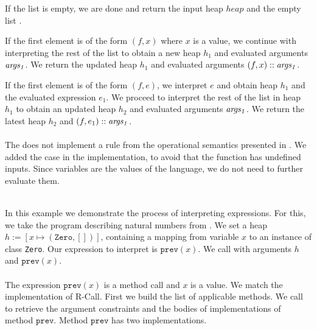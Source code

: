If the list is empty, we are done and return the input heap $heap$
and the empty list \nil.

If the first element is of the form $(f, x)$ where $x$ is a value,
we continue with interpreting the rest of the list
to obtain a new heap $h_1$ and evaluated arguments $\mathit{args_1}$.
We return the updated heap $h_1$ and evaluated arguments $(f, x) :: \mathit{args_1}$.

If the first element is of the form $(f, e)$,
we interpret $e$ and obtain heap $h_1$ and the evaluated expression $e_1$.
We proceed to interpret the rest of the list in heap $h_1$
to obtain an updated heap $h_2$ and evaluated arguments $\mathit{args_1}$.
We return the latest heap $h_2$ and $(f, e_1) :: \mathit{args_1}$.\\
\\
The  does not implement
a rule from the operational semantics presented in .
We added the case in the implementation,
to avoid that the function has undefined inputs.
Since variables are the values of the language,
we do not need to further evaluate them.
%
\begin{example}\quad\\
In this example we demonstrate the process of interpreting expressions.
For this, we take the program describing natural numbers from .
We set a heap $h := [x \mapsto (\texttt{Zero}, [])]$, containing
a mapping from variable $x$ to an instance of class \texttt{Zero}.
Our expression to interpret is $\texttt{prev}(x)$.
We call  with arguments $h$ and $\texttt{prev}(x)$.\\
\\
The expression $\texttt{prev}(x)$ is a method call and
$x$ is a value.
We match the implementation of R-Call.
First we build the list of applicable methods.
We call  to retrieve
the argument constraints and the bodies of
implementations of method $\texttt{prev}$.
Method $\texttt{prev}$ has two implementations.

\end{example}



